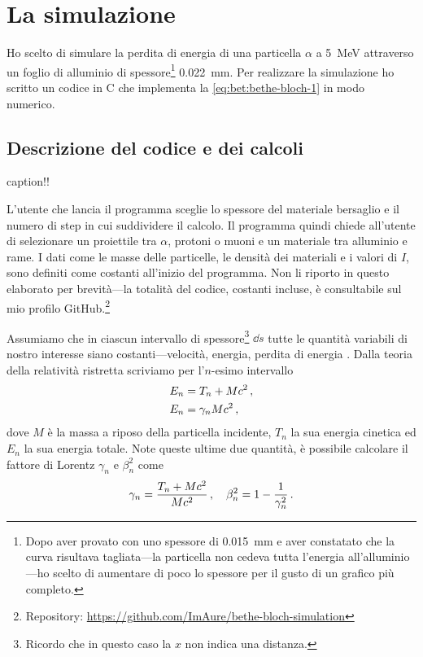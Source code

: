 \section{La simulazione}
    Ho scelto di simulare la perdita di energia di una particella $\alpha$ a \SI{5}{\mega\eV} attraverso un foglio di alluminio di spessore\footnote{Dopo aver provato con uno spessore di \SI{0.015}{\milli\meter} e aver constatato che la curva risultava tagliata---la particella non cedeva tutta l'energia all'alluminio---ho scelto di aumentare di poco lo spessore per il gusto di un grafico più completo.} \SI{0.022}{\milli\meter}. Per realizzare la simulazione ho scritto un codice in C che implementa la \eqref{eq:bet:bethe-bloch-1} in modo numerico.
    \subsection{Descrizione del codice e dei calcoli}
        \begin{table}
            \footnotesize
            \centering
            
            \caption{caption!!}
            \label{tab:bet:sim-costanti}
        \end{table}
        L'utente che lancia il programma sceglie lo spessore del materiale bersaglio e il numero di step in cui suddividere il calcolo. Il programma quindi chiede all'utente di selezionare un proiettile tra $\alpha$, protoni o muoni e un materiale tra alluminio e rame. I dati come le masse delle particelle, le densità dei materiali e i valori di $I$, sono definiti come costanti all'inizio del programma. Non li riporto in questo elaborato per brevità---la totalità del codice, costanti incluse, è consultabile sul mio profilo GitHub.\footnote{Repository: \url{https://github.com/ImAure/bethe-bloch-simulation}}
        
        Assumiamo che in ciascun intervallo di spessore\footnote{Ricordo che in questo caso la $x$ non indica una distanza.} $\dd{s}$ tutte le quantità variabili di nostro interesse siano costanti---velocità, energia, perdita di energia \myetc. Dalla teoria della relatività ristretta scriviamo per l'$n$-esimo intervallo
        \begin{align*}   
                E_n &= T_n + M c^2 \,, \\
                E_n &= \gamma_n M c^2 \,,
        \end{align*}
        dove $M$ è la massa a riposo della particella incidente, $T_n$ la sua energia cinetica ed $E_n$ la sua energia totale. Note queste ultime due quantità, è possibile calcolare il fattore di Lorentz $\gamma_n$ e $\beta_n^2$ come
        \begin{equation*}
            \gamma_n = \frac{T_n + M c^2}{M c^2}
            \,,
            \quad
            \beta_n^2 = 1 - \frac{1}{\gamma_n^2}
            \,.
        \end{equation*}

